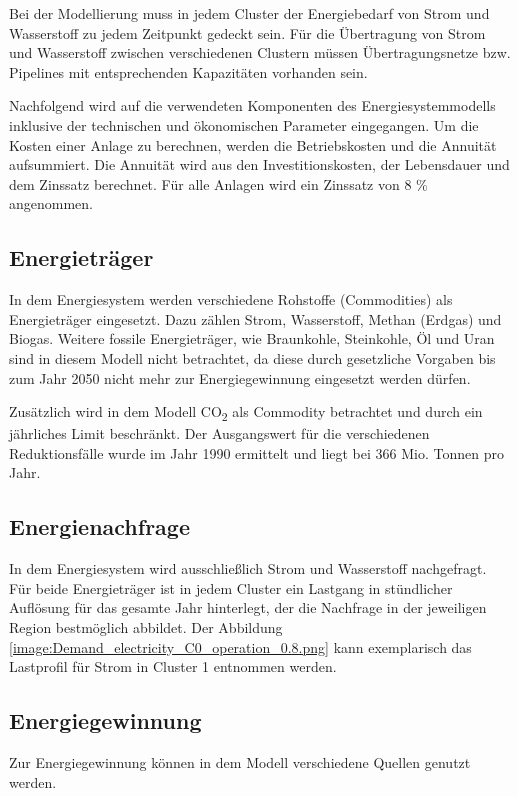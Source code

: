Bei der Modellierung muss in jedem Cluster der Energiebedarf von Strom und Wasserstoff zu jedem Zeitpunkt gedeckt sein. Für die Übertragung von Strom und Wasserstoff zwischen verschiedenen Clustern müssen Übertragungsnetze bzw. Pipelines mit entsprechenden Kapazitäten vorhanden sein. 

Nachfolgend wird auf die verwendeten Komponenten des Energiesystemmodells inklusive der technischen und ökonomischen Parameter eingegangen. 
Um die Kosten einer Anlage zu berechnen, werden die Betriebskosten und die Annuität aufsummiert. Die Annuität wird aus den Investitionskosten, der Lebensdauer und dem Zinssatz berechnet. Für alle Anlagen wird ein Zinssatz von 8 \% angenommen.
 
\subsection{Energieträger}
In dem Energiesystem werden verschiedene Rohstoffe (Commodities) als Energieträger eingesetzt. Dazu zählen Strom, Wasserstoff, Methan (Erdgas) und Biogas. Weitere fossile Energieträger, wie Braunkohle, Steinkohle, Öl und Uran sind in diesem Modell nicht betrachtet, da diese durch gesetzliche Vorgaben bis zum Jahr 2050 nicht mehr zur Energiegewinnung eingesetzt werden dürfen. \cite{bund}

Zusätzlich wird in dem Modell CO\textsubscript{2} als Commodity betrachtet und durch ein jährliches Limit beschränkt. Der Ausgangswert für die verschiedenen Reduktionsfälle wurde im Jahr 1990 ermittelt und liegt bei 366 Mio. Tonnen pro Jahr. 


\subsection{Energienachfrage}
In dem Energiesystem wird ausschließlich Strom und Wasserstoff nachgefragt. Für beide Energieträger ist in jedem Cluster ein Lastgang in stündlicher Auflösung für das gesamte Jahr hinterlegt, der die Nachfrage in der jeweiligen Region bestmöglich abbildet. Der Abbildung \ref{image:Demand_electricity_C0_operation_0.8.png} kann exemplarisch das Lastprofil für Strom in Cluster 1 entnommen werden. 


\subsection{Energiegewinnung}
Zur Energiegewinnung können in dem Modell verschiedene Quellen genutzt werden.


